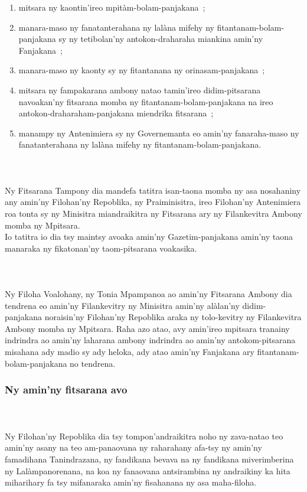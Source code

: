\documentclass[12pt]{article}
\newcounter{laharana}
\newcommand{\andininy}[0]{
  \paragraph{%
    \NoCaseChange{%
      Andininy~\addtocounter{laharana}{1}\thelaharana.}\label{and:\thelaharana}~%
  }%
}
\begin{document}
\begin{enumerate}
\item mitsara ny kaontin'ireo mpitàm-bolam-panjakana~;

\item manara-maso ny fanatanterahana ny lalàna mifehy ny
  fitantanam-bolam-panjakana sy ny tetibolan'ny antokon-draharaha miankina
  amin'ny Fanjakana~;

\item manara-maso ny kaonty sy ny fitantanana ny orinasam-panjakana~;

\item mitsara ny fampakarana ambony natao tamin'ireo didim-pitsarana navoakan'ny
  fitsarana momba ny fitantanam-bolam-panjakana na ireo
  antokon-draharaham-panjakana miendrika fitsarana~;

\item manampy ny Antenimiera sy ny Governemanta eo amin'ny fanaraha-maso ny
  fanatanterahana ny lalàna mifehy ny fitantanam-bolam-panjakana.
\end{enumerate}

\andininy{}Ny Fitsarana Tampony dia mandefa tatitra isan-taona momba ny asa
nosahaniny any amin'ny Filohan'ny Repoblika, ny Praiminisitra, ireo Filohan'ny
Antenimiera roa tonta sy ny Minisitra miandraikitra ny Fitsarana ary ny
Filankevitra Ambony momba ny Mpitsara.\\

\noindent
Io tatitra io dia tsy maintsy avoaka amin'ny Gazetim-panjakana amin'ny taona
manaraka ny fikatonan'ny taom-pitsarana voakasika.

\andininy{}Ny Filoha Voalohany, ny Tonia Mpampanoa ao amin'ny Fitsarana
Ambony dia tendrena eo amin'ny Filankevitry ny Minisitra amin'ny alàlan'ny
didim-panjakana noraisin'ny Filohan'ny Repoblika araka ny tolo-kevitry ny
Filankevitra Ambony momba ny Mpitsara. Raha azo atao, avy amin'ireo mpitsara
tranainy indrindra ao amin'ny laharana ambony indrindra ao amin'ny
antokom-pitsarana misahana ady madio sy ady heloka, ady atao amin'ny Fanjakana
ary fitantanam-bolam-panjakana no tendrena.

\subsubsection{Ny amin'ny fitsarana avo}
\label{sec:ny-aminny-fitsarana-3}

\andininy{}Ny Filohan'ny Repoblika dia tsy tompon'andraikitra noho ny
zava-natao teo amin'ny asany na teo am-panaovana ny raharahany afa-tsy ny
amin'ny famadihana Tanindrazana, ny fandikana bevava na ny fandikana
miverimberina ny Lalàmpanorenana, na koa ny fanaovana antsirambina ny andraikiny
ka hita miharihary fa tsy mifanaraka amin'ny fisahanana ny asa maha-filoha.\\
\end{document}
